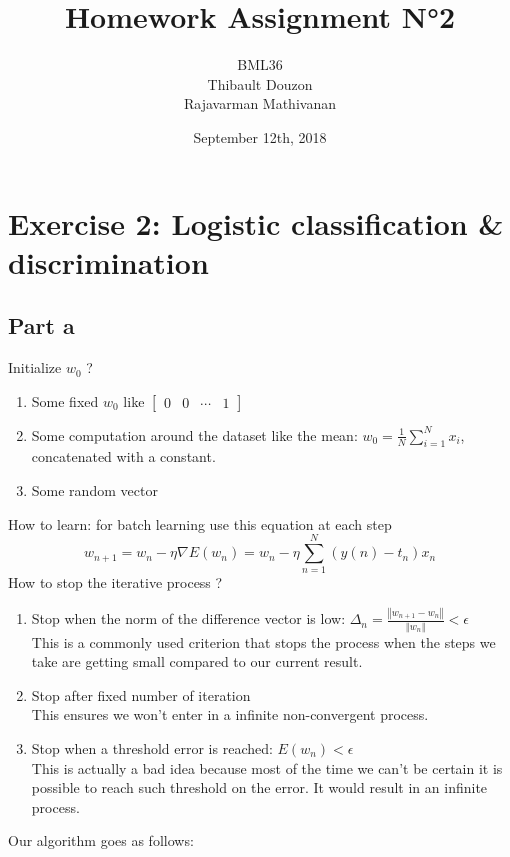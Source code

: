 \documentclass[a4paper, 10pt]{article}
\title{Homework Assignment N°2}
\author{BML36\\Thibault Douzon\\Rajavarman Mathivanan}
\date{September 12th, 2018}
\begin{document}
\maketitle

\pagebreak

\tableofcontents
\pagebreak

\section{Exercise 2: Logistic classification \& discrimination}

\subsection{Part a}
Initialize $w_0$ ?
\begin{enumerate}
    \item Some fixed $w_0$ like $\begin{bmatrix}0 & 0 & \cdots & 1\end{bmatrix}$
    \item Some computation around the dataset like the mean: $w_0 = \frac{1}{N}\sum_{i=1}^N x_i$, concatenated with a constant.
    \item Some random vector
\end{enumerate}
How to learn: for batch learning use this equation at each step
$$
w_{n+1} = w_n - \eta \nabla E(w_n) = w_n - \eta \sum_{n=1}^{N}\left(y(n)-t_n\right)x_n
$$
How to stop the iterative process ?
\begin{enumerate}
\item Stop when the norm of the difference vector is low: $\Delta_n = \frac{\left\Vert w_{n+1} - w_n\right\Vert}{\left\Vert w_n \right\Vert} < \epsilon$
\\
This is a commonly used criterion that stops the process when the steps we take are getting small compared to our current result.
\item Stop after fixed number of iteration
\\
This ensures we won't enter in a infinite non-convergent process. 
\item Stop when a threshold error is reached: $E(w_n) < \epsilon $
\\
This is actually a bad idea because most of the time we can't be certain it is possible to reach such threshold on the error.
It would result in an infinite process.
\end{enumerate}
Our algorithm goes as follows:
\end{document}
